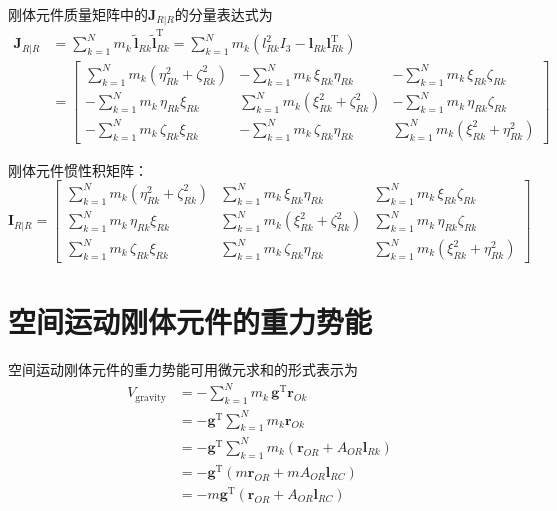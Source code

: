 刚体元件质量矩阵中的$\boldsymbol{J}_{R|R}$的分量表达式为
\begin{align}
\boldsymbol{J}_{R|R} &= \sum_{k=1}^{N} m_k\,\tilde{\boldsymbol{l}}_{Rk}\tilde{\boldsymbol{l}}_{Rk}^{\mathrm{T}}
 = \sum_{k=1}^{N} m_k\left(l_{Rk}^2 I_3 - \boldsymbol{l}_{Rk}\boldsymbol{l}_{Rk}^{\mathrm{T}}\right) \nonumber\\
&= \begin{bmatrix}
\displaystyle\sum_{k=1}^{N} m_k(\eta_{Rk}^2 + \zeta_{Rk}^2)  & -\displaystyle\sum_{k=1}^{N} m_k\,\xi_{Rk}\eta_{Rk} & -\displaystyle\sum_{k=1}^{N} m_k\,\xi_{Rk}\zeta_{Rk} \\[12pt]
-\displaystyle\sum_{k=1}^{N} m_k\,\eta_{Rk}\xi_{Rk} & \displaystyle\sum_{k=1}^{N} m_k(\xi_{Rk}^2 + \zeta_{Rk}^2)  & -\displaystyle\sum_{k=1}^{N} m_k\,\eta_{Rk}\zeta_{Rk} \\[12pt]
-\displaystyle\sum_{k=1}^{N} m_k\,\zeta_{Rk}\xi_{Rk} & -\displaystyle\sum_{k=1}^{N} m_k\,\zeta_{Rk}\eta_{Rk} & \displaystyle\sum_{k=1}^{N} m_k(\xi_{Rk}^2 + \eta_{Rk}^2)
\end{bmatrix}
\label{eq:8.8}
\end{align}

刚体元件惯性积矩阵：
\begin{equation}
\boldsymbol{I}_{R|R} =
\begin{bmatrix}
\displaystyle\sum_{k=1}^{N} m_k(\eta_{Rk}^2 + \zeta_{Rk}^2)  & \displaystyle\sum_{k=1}^{N} m_k\,\xi_{Rk}\eta_{Rk} & \displaystyle\sum_{k=1}^{N} m_k\,\xi_{Rk}\zeta_{Rk} \\[12pt]
\displaystyle\sum_{k=1}^{N} m_k\,\eta_{Rk}\xi_{Rk} & \displaystyle\sum_{k=1}^{N} m_k(\xi_{Rk}^2 + \zeta_{Rk}^2)  & \displaystyle\sum_{k=1}^{N} m_k\,\eta_{Rk}\zeta_{Rk} \\[12pt]
\displaystyle\sum_{k=1}^{N} m_k\,\zeta_{Rk}\xi_{Rk} & \displaystyle\sum_{k=1}^{N} m_k\,\zeta_{Rk}\eta_{Rk} & \displaystyle\sum_{k=1}^{N} m_k(\xi_{Rk}^2 + \eta_{Rk}^2)
\end{bmatrix}
\label{eq:8.9}
\end{equation}

\section{空间运动刚体元件的重力势能}

空间运动刚体元件的重力势能可用微元求和的形式表示为
\begin{align}
V_{\mathrm{gravity}} &= -\sum_{k=1}^{N} m_k\,\boldsymbol{g}^{\mathrm{T}}\boldsymbol{r}_{Ok} \nonumber\\
&= -\boldsymbol{g}^{\mathrm{T}}\sum_{k=1}^{N} m_k\boldsymbol{r}_{Ok} \nonumber\\
&= -\boldsymbol{g}^{\mathrm{T}}\sum_{k=1}^{N} m_k\left(\boldsymbol{r}_{OR} + A_{OR}\boldsymbol{l}_{Rk}\right) \nonumber\\
&= -\boldsymbol{g}^{\mathrm{T}}\left(m\boldsymbol{r}_{OR} + mA_{OR}\boldsymbol{l}_{RC}\right) \nonumber\\
&= -m\boldsymbol{g}^{\mathrm{T}}\left(\boldsymbol{r}_{OR} + A_{OR}\boldsymbol{l}_{RC}\right)
\label{eq:8.10}
\end{align}

